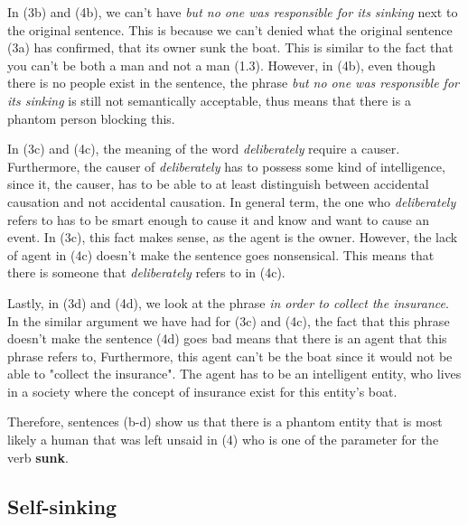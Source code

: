 \documentclass{article}
\begin{document}
In (3b) and (4b), we can't have \textit{but no one was responsible for its sinking} next to the original sentence. This is because we can't denied what the original sentence (3a) has confirmed, that its owner sunk the boat. This is similar to the fact that you can't be both a man and not a man (1.3). However, in (4b), even though there is no people exist in the sentence, the phrase \textit{but no one was responsible for its sinking} is still not semantically acceptable, thus means that there is a phantom person blocking this.


In (3c) and (4c), the meaning of the word \textit{deliberately} require a causer. Furthermore, the causer of \textit{deliberately} has to possess some kind of intelligence, since it, the causer, has to be able to at least distinguish between accidental causation and not accidental causation. In general term, the one who \textit{deliberately} refers to has to be smart enough to cause it and know and want to cause an event. In (3c), this fact makes sense, as the agent is the owner. However, the lack of agent in (4c) doesn't make the sentence goes nonsensical. This means that there is someone that \textit{deliberately} refers to in (4c). 

Lastly, in (3d) and (4d), we look at the phrase \textit{in order to collect the insurance}. In the similar argument we have had for (3c) and (4c), the fact that this phrase doesn't make the sentence (4d) goes bad means that there is an agent that this phrase refers to, Furthermore, this agent can't be the boat since it would not be able to "collect the insurance". The agent has to be an intelligent entity, who lives in a society where the concept of insurance exist for this entity's boat. 

Therefore, sentences (b-d) show us that there is a phantom entity that is most likely a human that was left unsaid in (4) who is one of the parameter for the verb \textbf{sunk}. 

\subsection{Self-sinking}
\end{document}
